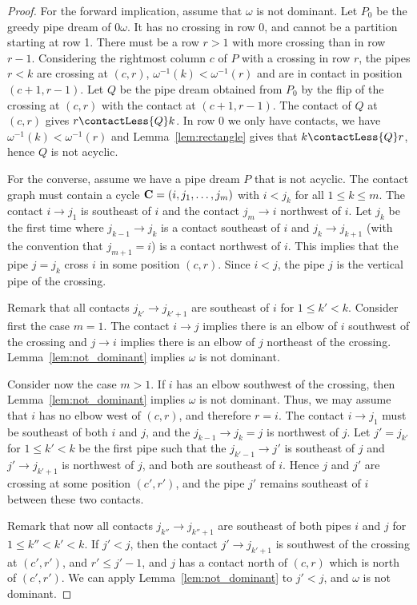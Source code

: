 \begin{proof}
For the forward implication, assume that $\omega$ is not dominant. Let $P_0$ be the greedy pipe dream of $0\omega$. It has no crossing in row 0, and cannot be a partition starting at row 1. There must be a row $r>1$ with more crossing than in row $r-1$. Considering the rightmost column $c$ of $P$ with a crossing in row $r$, the pipes $r<k$ are crossing at $(c,r)$, $\omega^{-1}(k)<\omega^{-1}(r)$ and are in contact in position $(c+1,r-1)$. Let $Q$ be the pipe dream obtained from $P_0$ by the flip of the crossing at $(c,r)$ with the contact at $(c+1,r-1)$. The contact of $Q$ at $(c,r)$ gives $r\contactLess{Q} k$. In row $0$ we only have contacts, we have $\omega^{-1}(k)<\omega^{-1}(r)$ and Lemma~\ref{lem:rectangle} gives that $k \contactLess{Q} r$, hence $Q$ is not acyclic.

For the converse, assume we have a pipe dream $P$ that is not acyclic. The contact graph must contain a cycle ${\bf C}=(i, j_1, \ldots, j_m)$ with $i<j_k$ for all $1\le k\le m$. The contact $i \to j_1$ is southeast of $i$ and the contact $j_m\to i$ northwest of $i$. Let $j_k$ be the first time where $j_{k-1}\to j_k$ is a contact southeast of $i$ and $j_k \to j_{k+1}$ (with the convention that $j_{m+1}=i$) is a contact northwest of $i$. This implies that the pipe $j=j_k$ cross $i$ in some position $(c,r)$. Since $i<j$, the pipe $j$ is the vertical pipe of the crossing.

Remark that all contacts $j_{k'}\to j_{k'+1}$ are southeast of $i$ for $1\le k' <k$. Consider first the case $m=1$. The contact $i\to j$ implies there is an elbow of $i$ southwest of the crossing and $j\to i$ implies there is an elbow of $j$ northeast of the crossing. Lemma~\ref{lem:not_dominant} implies $\omega$ is not dominant.

Consider now the case $m>1$. If $i$ has an elbow southwest of the crossing, then Lemma~\ref{lem:not_dominant} implies $\omega$ is not dominant. Thus, we may assume that $i$ has no elbow west of $(c,r)$, and therefore $r=i$. The contact $i\to j_1$ must be southeast of both $i$ and $j$, and the $j_{k-1}\to j_k=j$ is northwest of $j$. Let $j'=j_{k'}$ for $1\le k' <k$ be the first pipe such that the $j_{k'-1}\to j'$ is southeast of $j$ and $j'\to j_{k'+1}$ is northwest of $j$, and both are southeast of $i$. Hence $j$ and $j'$ are crossing at some position $(c',r')$, and the pipe $j'$ remains southeast of $i$ between these two contacts.

Remark that now all contacts $j_{k''}\to j_{k''+1}$ are southeast of both pipes $i$ and $j$ for $1\le k''<k'<k$. If $j'<j$, then the contact $j'\to j_{k'+1}$ is southwest of the crossing at $(c',r')$, and $r'\le j'-1$, and $j$ has a contact north of $(c,r)$ which is north of $(c',r')$. We can apply Lemma~\ref{lem:not_dominant} to $j'<j$, and $\omega$ is not dominant.


\end{proof}
